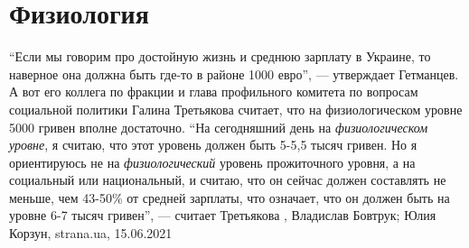  
 
 
 
 
\chapter{Физиология}

\enquote{Если мы говорим про достойную жизнь и среднюю зарплату в Украине, то
наверное она должна быть где-то в районе 1000 евро}, — утверждает Гетманцев.  А
вот его коллега по фракции и глава профильного комитета по вопросам социальной
политики Галина Третьякова считает, что на физиологическом уровне 5000 гривен
вполне достаточно.  \enquote{На сегодняшний день на \emph{физиологическом уровне}, я
считаю, что этот уровень должен быть 5-5,5 тысяч гривен. Но я ориентируюсь не
на \emph{физиологический} уровень прожиточного уровня, а на социальный или
национальный, и считаю, что он сейчас должен составлять не меньше, чем 43-50\%
от средней зарплаты, что означает, что он должен быть на уровне 6-7 тысяч
гривен}, — считает Третьякова
, 
Владислав Бовтрук; Юлия Корзун, strana.ua, 15.06.2021

